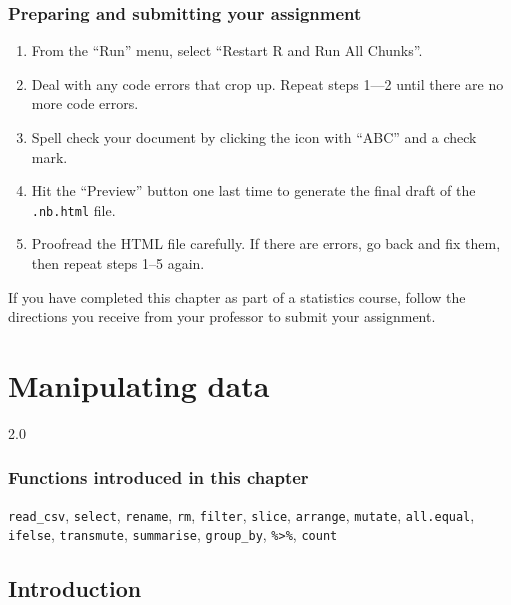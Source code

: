 \documentclass[
]{book}
\providecommand{\tightlist}{%
  \setlength{\itemsep}{0pt}\setlength{\parskip}{0pt}}
\begin{document}
\hypertarget{numerical-prep}{%
\subsection{Preparing and submitting your assignment}\label{numerical-prep}}

\begin{enumerate}
\def\labelenumi{\arabic{enumi}.}
\tightlist
\item
  From the ``Run'' menu, select ``Restart R and Run All Chunks''.
\item
  Deal with any code errors that crop up. Repeat steps 1---2 until there are no more code errors.
\item
  Spell check your document by clicking the icon with ``ABC'' and a check mark.
\item
  Hit the ``Preview'' button one last time to generate the final draft of the \texttt{.nb.html} file.
\item
  Proofread the HTML file carefully. If there are errors, go back and fix them, then repeat steps 1--5 again.
\end{enumerate}

If you have completed this chapter as part of a statistics course, follow the directions you receive from your professor to submit your assignment.

\hypertarget{manipulating}{%
\chapter{Manipulating data}\label{manipulating}}

2.0

\hypertarget{functions-introduced-in-this-chapter-4}{%
\subsection*{Functions introduced in this chapter}\label{functions-introduced-in-this-chapter-4}}

\texttt{read\_csv}, \texttt{select}, \texttt{rename}, \texttt{rm}, \texttt{filter}, \texttt{slice}, \texttt{arrange}, \texttt{mutate}, \texttt{all.equal}, \texttt{ifelse}, \texttt{transmute}, \texttt{summarise}, \texttt{group\_by}, \texttt{\%\textgreater{}\%}, \texttt{count}

\hypertarget{manipulating-intro}{%
\section{Introduction}\label{manipulating-intro}}
\end{document}
